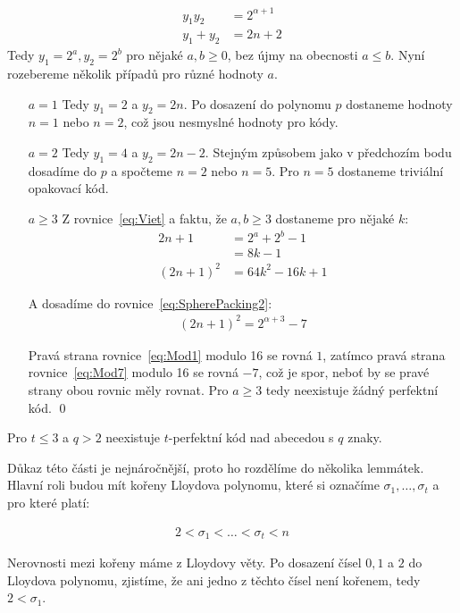\begin{align}
y_1y_2 &= 2^{\alpha + 1} \\
y_1 + y_2 &= 2n + 2 \label{eq:Viet}
\end{align}
Tedy $y_1 = 2^a, y_2 = 2^b$ pro nějaké $a,b \geq 0$, bez újmy na obecnosti $a \leq b$. Nyní rozebereme několik případů pro různé hodnoty $a$.

\begin{itemize}
\item[$a = 1$]
Tedy $y_1 = 2$ a $y_2 = 2n$. Po dosazení do polynomu $p$ dostaneme hodnoty $n = 1$ nebo $n = 2$, což jsou nesmyslné hodnoty pro kódy.
\item[$a = 2$]
Tedy $y_1 = 4$ a $y_2 = 2n -2$. Stejným způsobem jako v předchozím bodu dosadíme do $p$ a spočteme $n = 2$ nebo $n = 5$. Pro $n = 5$ dostaneme triviální opakovací kód.
\item[$a \geq 3$]
Z rovnice~\ref{eq:Viet} a faktu, že $a,b\geq 3$ dostaneme pro nějaké $k$:
\begin{align}
2n + 1 &= 2^a + 2^b - 1 \\
&= 8k - 1 \\
(2n + 1)^2 &= 64k^2 - 16k + 1 \label{eq:Mod1}
\end{align}

A dosadíme do rovnice~\ref{eq:SpherePacking2}:
\begin{align}
(2n + 1)^2 = 2^{\alpha + 3} - 7 \label{eq:Mod7}
\end{align}

Pravá strana rovnice~\ref{eq:Mod1} modulo 16 se rovná $1$, zatímco pravá strana rovnice~\ref{eq:Mod7} modulo 16 se rovná $-7$, což je spor, neboť by se pravé strany obou rovnic měly rovnat. Pro $a \geq 3$ tedy neexistuje žádný perfektní kód. \qed

\end{itemize}

\vt Pro $t \leq 3$ a $q > 2$ neexistuje $t$-perfektní kód nad abecedou s $q$ znaky.

Důkaz této části je nejnáročnější, proto ho rozdělíme do několika lemmátek. Hlavní roli budou mít kořeny Lloydova polynomu, které si označíme $\sigma_1, \dots, \sigma_t$ a pro které platí:

\begin{align*}
2 < \sigma_1 < \dots < \sigma_t < n
\end{align*}

Nerovnosti mezi kořeny máme z Lloydovy věty. Po dosazení čísel $0, 1$ a $2$ do Lloydova polynomu, zjistíme, že ani jedno z těchto čísel není kořenem, tedy $2 < \sigma_1$.

